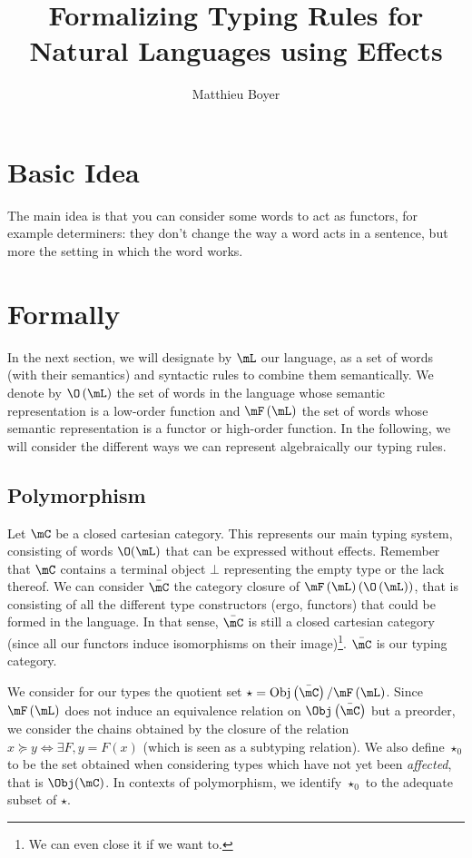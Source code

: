 \documentclass[math, english, info]{cours}
\title{Formalizing Typing Rules for Natural Languages using Effects}
\author{Matthieu Boyer}
\begin{document}
\bettertitle

\section{Basic Idea}
The main idea is that you can consider some words to act as functors, for example determiners: they don't change the way a word acts in a sentence,
but more the setting in which the word works.

\section{Formally}
In the next section, we will designate by $\mL$ our language, as a set of words (with their semantics) and syntactic rules to combine them semantically.
We denote by $\O\left( \mL \right)$ the set of words in the language whose semantic representation is a low-order function and $\mF\left( \mL \right)$ the set of words whose semantic representation is a functor or high-order function.
In the following, we will consider the different ways we can represent algebraically our typing rules.

\subsection{Polymorphism}
Let $\mC$ be a closed cartesian category. This represents our main typing system, consisting of words $\O(\mL)$ that can be expressed without effects.
Remember that $\mC$ contains a terminal object $\bot$ representing the empty type or the lack thereof.
We can consider $\bar{\mC}$ the category closure of $\mF\left( \mL \right)\left(\O\left( \mL \right)\right)$, that is consisting of all the different type constructors (ergo, functors) that could be formed in the language.
In that sense, $\bar{\mC}$ is still a closed cartesian category (since all our functors induce isomorphisms on their image)\footnote{We can even close it if we want to.}.
$\bar{\mC}$ is our typing category.

We consider for our types the quotient set $\star = \mathrm{Obj}\left( \bar{\mC} \right)/\mF\left( \mL \right)$.
Since $\mF\left( \mL \right)$ does not induce an equivalence relation on $\Obj\left( \bar{\mC} \right)$ but a preorder, we consider the chains obtained by the closure of the relation $x\succeq y \Leftrightarrow \exists F, y = F(x)$ (which is seen as a subtyping relation).
We also define $\star_{0}$ to be the set obtained when considering types which have not yet been \emph{affected}, that is $\Obj(\mC)$.
In contexts of polymorphism, we identify $\star_{0}$ to the adequate subset of $\star$.
\end{document}
